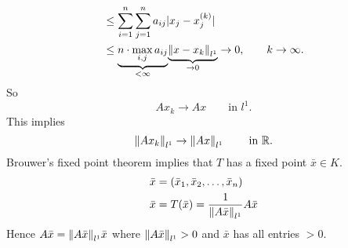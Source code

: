 \begin{beweis}
\begin{align*}
	&\leq  \sum^{n}_{i=1} \sum^{n}_{j=1} a_{ij} \abs{x_j-x_j^{(k)}} \\
	&\leq \underset{< \infty}{\underbrace{n \cdot \max\limits_{i,j} a_{ij}}} \underset{\to 0}{\underbrace{\norm{x-x_k}_{l^1}}} \to 0, \qquad k \to \infty.
\end{align*}
So \[
	Ax_k \to Ax \qquad \text{in }l^1.
\]
This implies
\[
	\norm{Ax_k}_{l^1} \to \norm{Ax}_{l^1} \qquad \text{ in }\mathbb{R}.
\]
Brouwer's fixed point theorem implies that $T$ has a fixed point $\bar{x} \in K$.
\begin{align*}
	\bar{x} &= (\bar{x}_1,\bar{x}_2,\dots,\bar{x}_n) \\
	\bar{x} &= T(\bar{x}) = \frac{1}{\norm{A \bar{x}}_{l^1}} A \bar{x} 
\end{align*}
Hence
$A \bar{x} = \norm{ A \bar{x}}_{l^1} \bar{x}$ where $\norm{A \bar{x}}_{l^1} >0$ and $\bar{x}$ has all entries $>0$.
\end{beweis}

